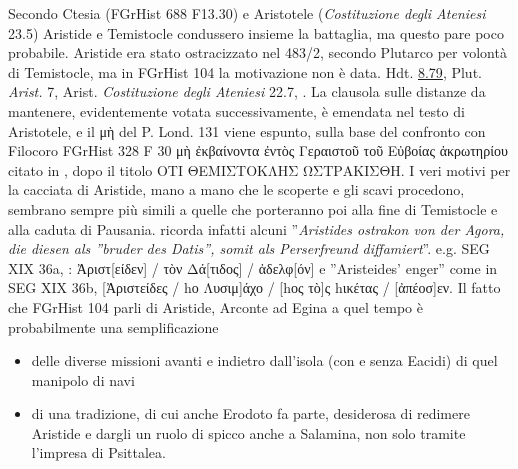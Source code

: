 {    Secondo Ctesia (FGrHist 688 F13.30) e Aristotele (\emph{Costituzione degli Ateniesi} 23.5) Aristide e Temistocle condussero insieme la battaglia, ma questo pare poco probabile. Aristide era stato ostracizzato nel 483/2, secondo Plutarco per volontà di Temistocle, ma in FGrHist 104 la motivazione non è data. Hdt. \href{http://data.perseus.org/citations/urn:cts:greekLit:tlg0016.tlg001.perseus-grc1:8.79}{8.79}, Plut. \emph{Arist.} 7, Arist. \emph{Costituzione degli Ateniesi} 22.7, \cite[37s]{Carcopino1935}. La clausola sulle distanze da mantenere, evidentemente votata successivamente, è emendata nel testo di Aristotele, e il \textgreek{μὴ} del P. Lond. 131 viene espunto, sulla base del confronto con Filocoro FGrHist 328 F 30 \textgreek{μὴ ἐκβαίνοντα ἐντὸς Γεραιστοῦ τοῦ Εὐβοίας ἀκρωτηρίου} citato in , dopo il titolo \textgreek{ΟΤΙ ΘΕΜΙΣΤΟΚΛΗΣ ΩΣΤΡΑΚΙΣΘΗ}. I veri motivi per la cacciata di Aristide, mano a mano che le scoperte e gli scavi procedono, sembrano sempre più simili a quelle che porteranno poi alla fine di Temistocle e alla caduta di Pausania. \cite[88 n.157]{Blosel2004} ricorda infatti alcuni ''\emph{Aristides ostrakon von der Agora, die diesen als ''bruder des Datis'', somit als Perserfreund diffamiert}''. e.g. SEG XIX 36a, \cite[38 n.56]{Lang1990}: \textgreek{Ἀριστ[είδεν] / τὸν Δά[τιδος] / ἀδελφ[όν]} e ''Aristeides' enger'' come in SEG XIX 36b, \textgreek{[Ἀριστείδες / }h\textgreek{ο Λυσιμ]άχο / [}h\textgreek{ος τὸ]ς} h\textgreek{ικέτας / [ἀπέοσ]εν.} Il fatto che FGrHist 104 parli di Aristide, Arconte ad Egina a quel tempo è probabilmente una semplificazione 
    \begin{itemize}
    \item delle diverse missioni avanti e indietro dall'isola (con e senza Eacidi) di quel manipolo di navi
    \item di una tradizione, di cui anche Erodoto fa parte, desiderosa di redimere Aristide e dargli un ruolo di spicco anche a Salamina, non solo tramite l'impresa di Psittalea. 

\end{itemize}}

